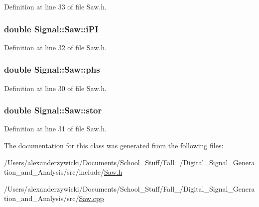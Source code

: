 Definition at line 33 of file Saw.\+h.

\hypertarget{classSignal_1_1Saw_a75052e172f2d3c7ffc8daae2988f7305}{
\subsubsection[{i\+P\+I}]{\setlength{\rightskip}{0pt plus 5cm}double Signal\+::\+Saw\+::i\+P\+I\hspace{0.3cm}{\ttfamily [protected]}}}\label{classSignal_1_1Saw_a75052e172f2d3c7ffc8daae2988f7305}


Definition at line 32 of file Saw.\+h.

\hypertarget{classSignal_1_1Saw_a96d64ea69f7930c8d7640ecd6944dc84}{
\subsubsection[{phs}]{\setlength{\rightskip}{0pt plus 5cm}double Signal\+::\+Saw\+::phs\hspace{0.3cm}{\ttfamily [protected]}}}\label{classSignal_1_1Saw_a96d64ea69f7930c8d7640ecd6944dc84}


Definition at line 30 of file Saw.\+h.

\hypertarget{classSignal_1_1Saw_a7c038cabed8c0b51136f16794c9142fd}{
\subsubsection[{stor}]{\setlength{\rightskip}{0pt plus 5cm}double Signal\+::\+Saw\+::stor\hspace{0.3cm}{\ttfamily [protected]}}}\label{classSignal_1_1Saw_a7c038cabed8c0b51136f16794c9142fd}


Definition at line 31 of file Saw.\+h.



The documentation for this class was generated from the following files\+:\begin{DoxyCompactItemize}
\item 
/\+Users/alexanderzywicki/\+Documents/\+School\+\_\+\+Stuff/\+Fall\+\_/\+Digital\+\_\+\+Signal\+\_\+\+Generation\+\_\+and\+\_\+\+Analysis/src/include/\hyperlink{Saw_8h}{Saw.\+h}\item 
/\+Users/alexanderzywicki/\+Documents/\+School\+\_\+\+Stuff/\+Fall\+\_/\+Digital\+\_\+\+Signal\+\_\+\+Generation\+\_\+and\+\_\+\+Analysis/src/\hyperlink{Saw_8cpp}{Saw.\+cpp}\end{DoxyCompactItemize}
